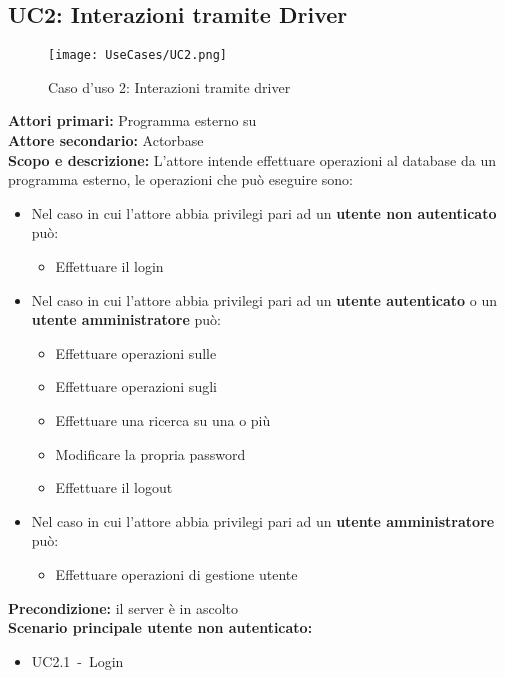 \documentclass{scalatekids-article}
\begin{document}
\subsection{UC2: Interazioni tramite Driver}
\begin{figure}[H]
  \begin{center}
    \texttt{[image: UseCases/UC2.png]}
    \caption*{Caso d'uso 2: Interazioni tramite driver}
  \end{center}
\end{figure}
\textbf{Attori primari:} Programma esterno su \\
\textbf{Attore secondario:} Actorbase\\
\textbf{Scopo e descrizione:} L'attore intende effettuare operazioni al database da un programma  esterno, le operazioni che può eseguire sono:
\begin{itemize} %
\item Nel caso in cui l'attore abbia privilegi pari ad un \textbf{utente non autenticato} può:
  \begin{itemize}
  \item Effettuare il login
  \end{itemize}
\item Nel caso in cui l'attore abbia privilegi pari ad un \textbf{utente autenticato} o un \textbf{utente amministratore} può:
  \begin{itemize}
  \item Effettuare operazioni sulle 
  \item Effettuare operazioni sugli 
  \item Effettuare una ricerca su una o più 
  \item Modificare la propria password
  \item Effettuare il logout
  \end{itemize}
\item Nel caso in cui l'attore abbia privilegi pari ad un \textbf{utente amministratore} può:
  \begin{itemize}
  \item Effettuare operazioni di gestione utente
  \end{itemize}
\end{itemize}
\textbf{Precondizione:} il server è in ascolto\\
\textbf{Scenario principale utente non autenticato:}
\begin{itemize}
\item UC2.1\ -\ Login
\end{itemize}
\end{document}
